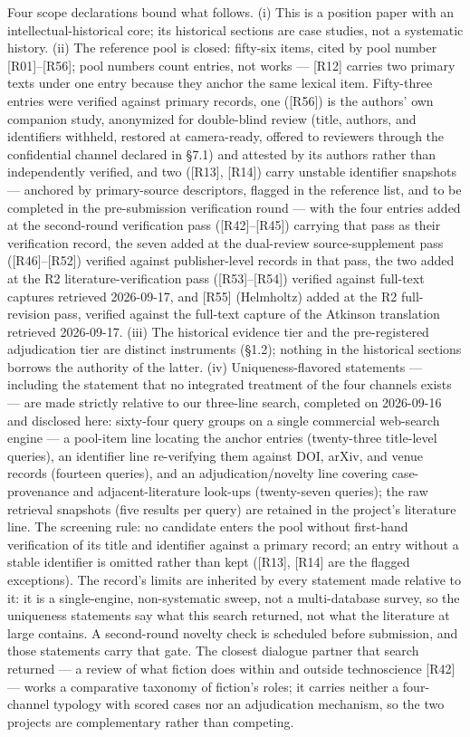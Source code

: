 \documentclass[11pt,a4paper]{article}
\begin{document}
Four scope declarations bound what follows. (i) This is a position paper with an intellectual-historical core; its historical sections are case studies, not a systematic history. (ii) The reference pool is closed: fifty-six items, cited by pool number [R01]–[R56]; pool numbers count entries, not works — [R12] carries two primary texts under one entry because they anchor the same lexical item. Fifty-three entries were verified against primary records, one ([R56]) is the authors' own companion study, anonymized for double-blind review (title, authors, and identifiers withheld, restored at camera-ready, offered to reviewers through the confidential channel declared in §7.1) and attested by its authors rather than independently verified, and two ([R13], [R14]) carry unstable identifier snapshots — anchored by primary-source descriptors, flagged in the reference list, and to be completed in the pre-submission verification round — with the four entries added at the second-round verification pass ([R42]–[R45]) carrying that pass as their verification record, the seven added at the dual-review source-supplement pass ([R46]–[R52]) verified against publisher-level records in that pass, the two added at the R2 literature-verification pass ([R53]–[R54]) verified against full-text captures retrieved 2026-09-17, and [R55] (Helmholtz) added at the R2 full-revision pass, verified against the full-text capture of the Atkinson translation retrieved 2026-09-17. (iii) The historical evidence tier and the pre-registered adjudication tier are distinct instruments (§1.2); nothing in the historical sections borrows the authority of the latter. (iv) Uniqueness-flavored statements — including the statement that no integrated treatment of the four channels exists — are made strictly relative to our three-line search, completed on 2026-09-16 and disclosed here: sixty-four query groups on a single commercial web-search engine — a pool-item line locating the anchor entries (twenty-three title-level queries), an identifier line re-verifying them against DOI, arXiv, and venue records (fourteen queries), and an adjudication/novelty line covering case-provenance and adjacent-literature look-ups (twenty-seven queries); the raw retrieval snapshots (five results per query) are retained in the project's literature line. The screening rule: no candidate enters the pool without first-hand verification of its title and identifier against a primary record; an entry without a stable identifier is omitted rather than kept ([R13], [R14] are the flagged exceptions). The record's limits are inherited by every statement made relative to it: it is a single-engine, non-systematic sweep, not a multi-database survey, so the uniqueness statements say what this search returned, not what the literature at large contains. A second-round novelty check is scheduled before submission, and those statements carry that gate. The closest dialogue partner that search returned — a review of what fiction does within and outside technoscience [R42] — works a comparative taxonomy of fiction's roles; it carries neither a four-channel typology with scored cases nor an adjudication mechanism, so the two projects are complementary rather than competing.
\end{document}
